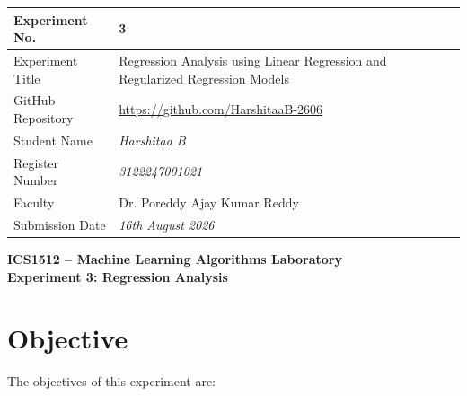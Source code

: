 \documentclass[12pt,a4paper]{article}
\begin{document}

\begin{tabular}{|p{4cm}|p{11cm}|}
\hline
Experiment No. & 3 \\ \hline
Experiment Title & Regression Analysis using Linear Regression and Regularized Regression Models \\ \hline
GitHub Repository & \url{https://github.com/HarshitaaB-2606} \\ \hline
Student Name & \textit{Harshitaa B} \\ \hline
Register Number & \textit{3122247001021} \\ \hline
Faculty & Dr. Poreddy Ajay Kumar Reddy \\ \hline
Submission Date & \textit{16th August 2026} \\ \hline
\end{tabular}

\vspace{0.5cm}

\begin{center}
    {\Large\textbf{ICS1512 -- Machine Learning Algorithms Laboratory}}\\[0.2cm]
    {\large\textbf{Experiment 3: Regression Analysis}}
\end{center}

\section{Objective}

The objectives of this experiment are:
\end{document}
